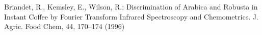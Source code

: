 \documentclass[conference]{IEEEtran}
\begin{document}
\begin{thebibliography}{5}
Briandet, R., Kemsley, E., Wilson, R.:
Discrimination of Arabica and Robusta in Instant Coffee by Fourier Transform Infrared Spectroscopy
and Chemometrics.
J. Agric. Food Chem, 44, 170--174 (1996)







\end{thebibliography}
\end{document}
